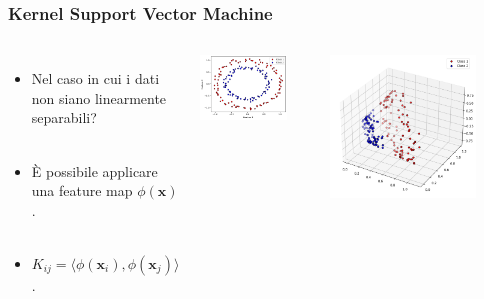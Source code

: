 \documentclass{beamer}
\begin{document}
  \begin{frame}
    \frametitle{Kernel Support Vector Machine}
    \begin{columns}
    
      \begin{itemize}
        \item Nel caso in cui i dati non siano linearmente separabili?\\\,
        \item È possibile applicare una feature map $\phi(\mathbf{x})$.\\\,
        \item $K_{ij}=\langle \phi(\mathbf{x}_i), \phi(\mathbf{x}_j)\rangle$. \\\,\\\,
      \end{itemize}
      
   
  
      \begin{minipage}{\textwidth}
        \centering
        \includegraphics[width=0.8\textwidth]{images/circles.png}
    \end{minipage}
    \begin{minipage}{\textwidth}
        \centering
        \includegraphics[width=0.8\textwidth]{images/circles3d.png}
    \end{minipage}
  

\end{columns}
\end{frame}
\end{document}
